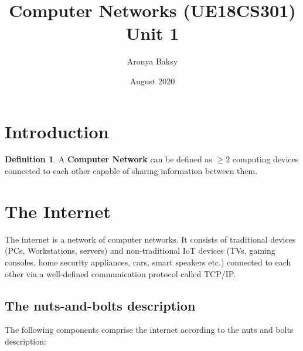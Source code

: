 \documentclass{article}
\title{Computer Networks (UE18CS301)\\
 \large Unit 1
 }
\author{Aronya Baksy}
\date{August 2020}
\theoremstyle{plain}
\theoremstyle{definition}
\newtheorem{defn}{Definition} %
\begin{document}
\maketitle

\section{Introduction}
\begin{defn}
    A \textbf{Computer Network} can be defined as $\geq 2$ computing devices connected to each other capable of sharing information between them.
\end{defn}

\section{The Internet}

The internet is a network of computer networks. It consists of traditional devices (PCs, Workstations, servers) and non-traditional IoT devices (TVs, gaming consoles, home security appliances, cars, smart speakers etc.) connected to each other via a well-defined communication protocol called TCP/IP. 

\subsection{The nuts-and-bolts description}

The following components comprise the internet according to the nuts and bolts description: 
\end{document}
